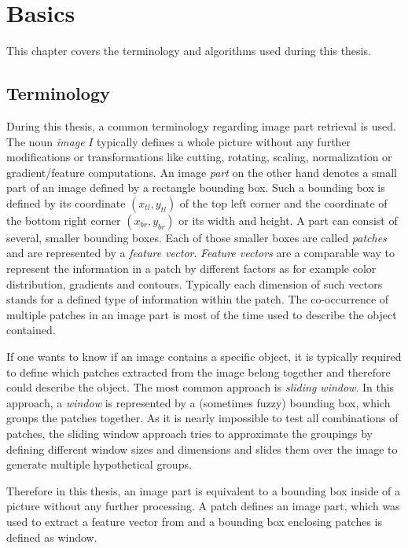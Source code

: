 \chapter{Basics}

This chapter covers the terminology and algorithms used during this thesis. 

\section{Terminology}
\label{sec:basic:terminology}

During this thesis, a common terminology regarding image part retrieval is used. The noun \textit{image} $I$ typically defines a whole picture without any further modifications or transformations like cutting, rotating, scaling, normalization or gradient/feature computations. An image \textit{part} on the other hand denotes a small part of an image defined by a rectangle bounding box. Such a bounding box is defined by its coordinate $(x_{tl},y_{tl})$ of the top left corner and the coordinate of the bottom right corner $(x_{br},y_{br})$ or its width and height. A part can consist of several, smaller bounding boxes. Each of those smaller boxes are called \textit{patches} and are represented by a \textit{feature vector}. \textit{Feature vectors} are a comparable way to represent the information in a patch by different factors as for example color distribution, gradients and contours. Typically each dimension of such vectors stands for a defined type of information within the patch. The co-occurrence of multiple patches in an image part is most of the time used to describe the object contained.

If one wants to know if an image contains a specific object, it is typically required to define which patches extracted from the image belong together and therefore could describe the object. The most common approach is \textit{sliding window}. In this approach, a \textit{window} is represented by a (sometimes fuzzy) bounding box, which groups the patches together. As it is nearly impossible to test all combinations of patches, the sliding window approach tries to approximate the groupings by defining different window sizes and dimensions and slides them over the image to generate multiple hypothetical groups.

Therefore in this thesis, an image part is equivalent to a bounding box inside of a picture without any further processing. A patch defines an image part, which was used to extract a feature vector from and a bounding box enclosing patches is defined as window.
\bigskip

